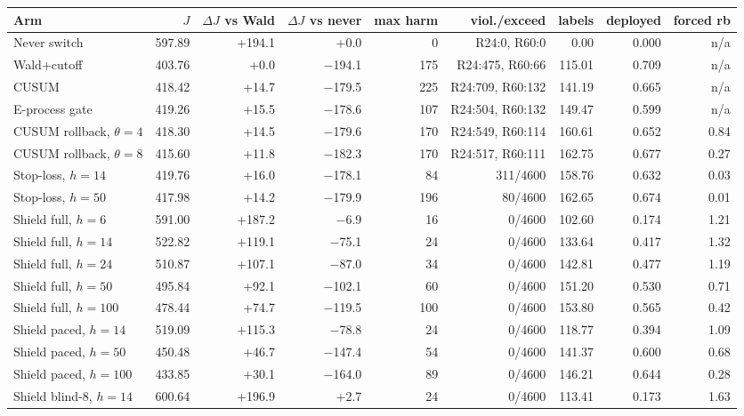 \begin{tabular}{@{}l r r r r r r r r@{}}
\toprule
Arm & $J$ & $\Delta J$ vs Wald & $\Delta J$ vs never & max harm & viol./exceed & labels & deployed & forced rb \\
\midrule
Never switch & 597.89 & +194.1 & +0.0 & 0 & R24:0, R60:0 & 0.00 & 0.000 & n/a \\
Wald+cutoff & 403.76 & +0.0 & $-$194.1 & 175 & R24:475, R60:66 & 115.01 & 0.709 & n/a \\
CUSUM & 418.42 & +14.7 & $-$179.5 & 225 & R24:709, R60:132 & 141.19 & 0.665 & n/a \\
E-process gate & 419.26 & +15.5 & $-$178.6 & 107 & R24:504, R60:132 & 149.47 & 0.599 & n/a \\
CUSUM rollback, $\theta=4$ & 418.30 & +14.5 & $-$179.6 & 170 & R24:549, R60:114 & 160.61 & 0.652 & 0.84 \\
CUSUM rollback, $\theta=8$ & 415.60 & +11.8 & $-$182.3 & 170 & R24:517, R60:111 & 162.75 & 0.677 & 0.27 \\
Stop-loss, $h=14$ & 419.76 & +16.0 & $-$178.1 & 84 & 311/4600 & 158.76 & 0.632 & 0.03 \\
Stop-loss, $h=50$ & 417.98 & +14.2 & $-$179.9 & 196 & 80/4600 & 162.65 & 0.674 & 0.01 \\
Shield full, $h=6$ & 591.00 & +187.2 & $-$6.9 & 16 & 0/4600 & 102.60 & 0.174 & 1.21 \\
Shield full, $h=14$ & 522.82 & +119.1 & $-$75.1 & 24 & 0/4600 & 133.64 & 0.417 & 1.32 \\
Shield full, $h=24$ & 510.87 & +107.1 & $-$87.0 & 34 & 0/4600 & 142.81 & 0.477 & 1.19 \\
Shield full, $h=50$ & 495.84 & +92.1 & $-$102.1 & 60 & 0/4600 & 151.20 & 0.530 & 0.71 \\
Shield full, $h=100$ & 478.44 & +74.7 & $-$119.5 & 100 & 0/4600 & 153.80 & 0.565 & 0.42 \\
Shield paced, $h=14$ & 519.09 & +115.3 & $-$78.8 & 24 & 0/4600 & 118.77 & 0.394 & 1.09 \\
Shield paced, $h=50$ & 450.48 & +46.7 & $-$147.4 & 54 & 0/4600 & 141.37 & 0.600 & 0.68 \\
Shield paced, $h=100$ & 433.85 & +30.1 & $-$164.0 & 89 & 0/4600 & 146.21 & 0.644 & 0.28 \\
Shield blind-8, $h=14$ & 600.64 & +196.9 & +2.7 & 24 & 0/4600 & 113.41 & 0.173 & 1.63 \\
\bottomrule
\end{tabular}

